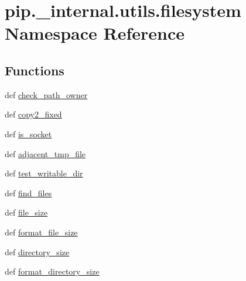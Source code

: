 \hypertarget{namespacepip_1_1__internal_1_1utils_1_1filesystem}{}\section{pip.\+\_\+internal.\+utils.\+filesystem Namespace Reference}
\label{namespacepip_1_1__internal_1_1utils_1_1filesystem}
\subsection*{Functions}
\begin{DoxyCompactItemize}
\item 
def \hyperlink{namespacepip_1_1__internal_1_1utils_1_1filesystem_a3424f1b7108c40853a810f9b9ba76bd1}{check\+\_\+path\+\_\+owner}
\item 
def \hyperlink{namespacepip_1_1__internal_1_1utils_1_1filesystem_a1f70e96ad378255bfdcd74e91d985c96}{copy2\+\_\+fixed}
\item 
def \hyperlink{namespacepip_1_1__internal_1_1utils_1_1filesystem_ac07f8276e0aa1d6e499e2c17d4aacfd8}{is\+\_\+socket}
\item 
def \hyperlink{namespacepip_1_1__internal_1_1utils_1_1filesystem_a7021b68876635eb4bc8040b7b794d971}{adjacent\+\_\+tmp\+\_\+file}
\item 
def \hyperlink{namespacepip_1_1__internal_1_1utils_1_1filesystem_a857743f652d244d7371fb426ef7df32a}{test\+\_\+writable\+\_\+dir}
\item 
def \hyperlink{namespacepip_1_1__internal_1_1utils_1_1filesystem_a3471edb70f6e3b0363d7d87f79fd920c}{find\+\_\+files}
\item 
def \hyperlink{namespacepip_1_1__internal_1_1utils_1_1filesystem_a1c9e4466a1683631c28a5166ab00eb8b}{file\+\_\+size}
\item 
def \hyperlink{namespacepip_1_1__internal_1_1utils_1_1filesystem_aa4769977833dbfe68304a7180cfbdae8}{format\+\_\+file\+\_\+size}
\item 
def \hyperlink{namespacepip_1_1__internal_1_1utils_1_1filesystem_ab290ffb0b9317d2800c3bca130c98175}{directory\+\_\+size}
\item 
def \hyperlink{namespacepip_1_1__internal_1_1utils_1_1filesystem_acd75346680424fb1d750582baa227bb7}{format\+\_\+directory\+\_\+size}
\end{DoxyCompactItemize}
